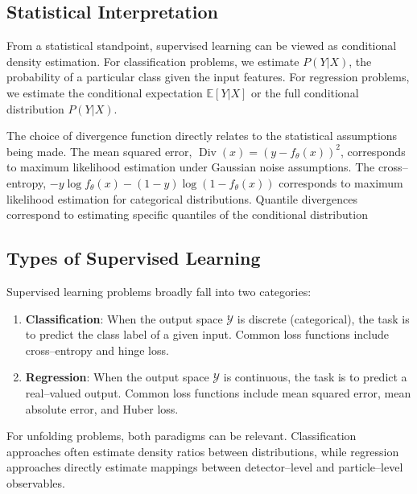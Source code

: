    \subsection{Statistical Interpretation}
    \label{subsec:supervised_learning.statistical_interpretation}
        From a statistical standpoint, supervised learning can be viewed as conditional density estimation.
        For classification problems, we estimate \(P(Y|X)\), the probability of a particular class given the input features.
        For regression problems, we estimate the conditional expectation \(\mathbb{E}[Y|X]\) or the full conditional distribution \(P(Y|X)\).

        The choice of divergence function directly relates to the statistical assumptions being made.
        The mean squared error, \(\operatorname{Div}(x) = (y - f_\theta(x))^2\), corresponds to maximum likelihood estimation under Gaussian noise assumptions. The cross--entropy, \(-y\log f_\theta(x) - (1-y)\log(1 - f_\theta(x))\) corresponds to maximum likelihood estimation for categorical distributions.
        Quantile divergences correspond to estimating specific quantiles of the conditional distribution

    \subsection{Types of Supervised Learning}
        Supervised learning problems broadly fall into two categories:
        \begin{enumerate}
            \item \textbf{Classification}:
            When the output space \(\mathcal{Y}\) is discrete (categorical), the task is to predict the class label of a given input.
            Common loss functions include cross--entropy and hinge loss.
            \item \textbf{Regression}:
            When the output space \(\mathcal{Y}\) is continuous, the task is to predict a real--valued output.
            Common loss functions include mean squared error, mean absolute error, and Huber loss.
        \end{enumerate}
        For unfolding problems, both paradigms can be relevant.
        Classification approaches often estimate density ratios between distributions, while regression approaches directly estimate mappings between detector--level and particle--level observables.
